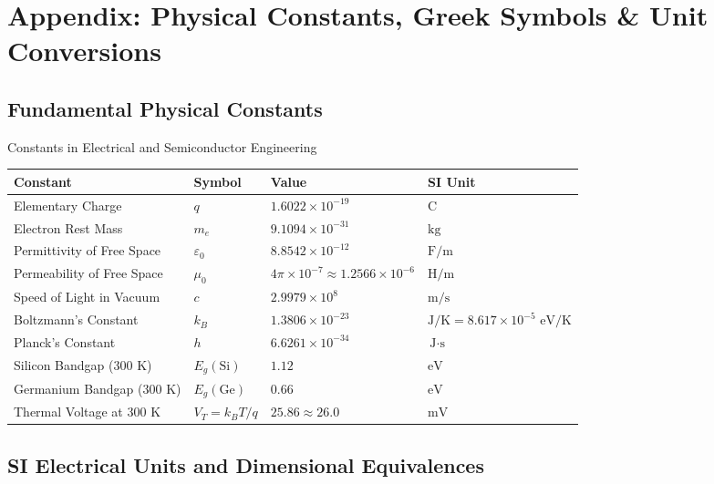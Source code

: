 \chapter{Appendix: Physical Constants, Greek Symbols \& Unit Conversions}

\section{Fundamental Physical Constants}

\begin{formulabox}{Constants in Electrical and Semiconductor Engineering}
\begin{center}\small
\begin{tabularx}{\linewidth}{l l l l}
\toprule
\textbf{Constant} & \textbf{Symbol} & \textbf{Value} & \textbf{SI Unit} \\
\midrule
Elementary Charge & $q$ & $1.6022 \times 10^{-19}$ & $\text{C}$ \\
Electron Rest Mass & $m_e$ & $9.1094 \times 10^{-31}$ & $\text{kg}$ \\
Permittivity of Free Space & $\varepsilon_0$ & $8.8542 \times 10^{-12}$ & $\text{F/m}$ \\
Permeability of Free Space & $\mu_0$ & $4\pi \times 10^{-7} \approx 1.2566 \times 10^{-6}$ & $\text{H/m}$ \\
Speed of Light in Vacuum & $c$ & $2.9979 \times 10^8$ & $\text{m/s}$ \\
Boltzmann's Constant & $k_B$ & $1.3806 \times 10^{-23}$ & $\text{J/K} = 8.617 \times 10^{-5}\text{ eV/K}$ \\
Planck's Constant & $h$ & $6.6261 \times 10^{-34}$ & $\text{J}\cdot\text{s}$ \\
Silicon Bandgap (300 K) & $E_g(\text{Si})$ & $1.12$ & $\text{eV}$ \\
Germanium Bandgap (300 K) & $E_g(\text{Ge})$ & $0.66$ & $\text{eV}$ \\
Thermal Voltage at 300 K & $V_T = k_B T / q$ & $25.86 \approx 26.0$ & $\text{mV}$ \\
\bottomrule
\end{tabularx}
\end{center}
\end{formulabox}

\section{SI Electrical Units and Dimensional Equivalences}

